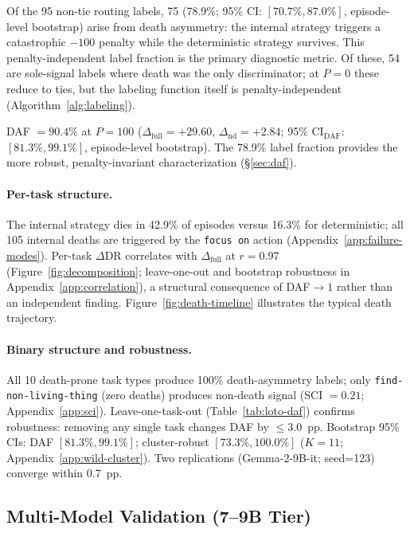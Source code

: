 Of the 95 non-tie routing labels, 75 (78.9\%; 95\% CI: $[70.7\%, 87.0\%]$, episode-level bootstrap) arise from death asymmetry: the internal strategy triggers a catastrophic $-100$ penalty while the deterministic strategy survives. This penalty-independent label fraction is the primary diagnostic metric. Of these, 54 are sole-signal labels where death was the only discriminator; at $P{=}0$ these reduce to ties, but the labeling function itself is penalty-independent (Algorithm~\ref{alg:labeling}).

DAF $= 90.4\%$ at $P{=}100$ ($\Delta_{\text{full}} = +29.60$, $\Delta_{\text{nd}} = +2.84$; 95\% CI$_{\text{DAF}}$: $[81.3\%, 99.1\%]$, episode-level bootstrap). The 78.9\% label fraction provides the more robust, penalty-invariant characterization (\S\ref{sec:daf}).

\paragraph{Per-task structure.}
The internal strategy dies in 42.9\% of episodes versus 16.3\% for deterministic; all 105 internal deaths are triggered by the \texttt{focus on} action (Appendix~\ref{app:failure-modes}). Per-task $\Delta$DR correlates with $\Delta_{\text{full}}$ at $r = 0.97$ (Figure~\ref{fig:decomposition}; leave-one-out and bootstrap robustness in Appendix~\ref{app:correlation}), a structural consequence of DAF$\to 1$ rather than an independent finding. Figure~\ref{fig:death-timeline} illustrates the typical death trajectory.

\paragraph{Binary structure and robustness.}
All 10 death-prone task types produce 100\% death-asymmetry labels; only \texttt{find-non-living-thing} (zero deaths) produces non-death signal (SCI $= 0.21$; Appendix~\ref{app:sci}). Leave-one-task-out (Table~\ref{tab:loto-daf}) confirms robustness: removing any single task changes DAF by $\leq$3.0~pp. Bootstrap 95\% CIs: DAF $[81.3\%, 99.1\%]$; cluster-robust $[73.3\%, 100.0\%]$ ($K{=}11$; Appendix~\ref{app:wild-cluster}). Two replications (Gemma-2-9B-it; seed=123) converge within 0.7~pp.

\subsection{Multi-Model Validation (7--9B Tier)}
\label{sec:cross-model}

